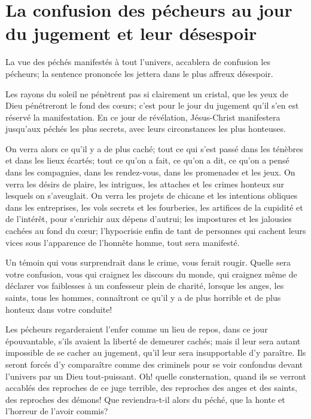\documentclass[instructions.tex]{subfiles}
\begin{document}
 
\chapter{La confusion des pécheurs au jour du jugement et leur désespoir}
 
La vue des péchés manifestés à tout l’univers, accablera de confusion les pécheurs; la sentence prononcée les jettera dans le plus affreux désespoir.
 
\primo  Les rayons du soleil ne pénètrent pas si clairement un cristal, que les yeux de Dieu pénétreront le fond des cœurs; c’est pour le jour du jugement qu’il s’en est réservé la manifestation. En ce jour de révélation, Jésus-Christ manifestera jusqu’aux péchés les plus secrets, avec leurs circonstances les plus honteuses.
 
On verra alors ce qu’il y a de plus caché; tout ce qui s’est passé dans les ténèbres et dans les lieux écartés; tout ce qu’on a fait, ce qu’on a dit, ce qu’on a pensé dans les compagnies, dans les rendez-vous, dans les promenades et les jeux. On verra les désirs de plaire, les intrigues, les attaches et les crimes honteux sur lesquels on s’aveuglait. On verra les projets de chicane et les intentions obliques dans les entreprises, les vols secrets et les fourberies, les artifices de la cupidité et de l’intérêt, pour s’enrichir aux dépens d’autrui; les impostures et les jalousies cachées au fond du cœur; l’hypocrisie enfin de tant de personnes qui cachent leurs vices sous l’apparence de l’honnête homme, tout sera manifesté.
 
Un témoin qui vous surprendrait dans le crime, vous ferait rougir. Quelle sera votre confusion, vous qui craignez les discours du monde, qui craignez même de déclarer vos faiblesses à un confesseur plein de charité, lorsque les anges, les saints, tous les hommes, connaîtront ce qu’il y a de plus horrible et de plus honteux dans votre conduite!
 
Les pécheurs regarderaient l’enfer comme un lieu de repos, dans ce jour épouvantable, s’ils avaient la liberté de demeurer cachés; mais il leur sera autant impossible de se cacher au jugement, qu’il leur sera insupportable d’y paraître. Ils seront forcés d’y comparaître comme des criminels pour se voir confondus devant l’univers par un Dieu tout-puissant. Oh! quelle consternation, quand ils se verront accablés des reproches de ce juge terrible, des reproches des anges et des saints, des reproches des démons! Que reviendra-t-il alors du péché, que la honte et l’horreur de l’avoir commis?
 
\end{document}
